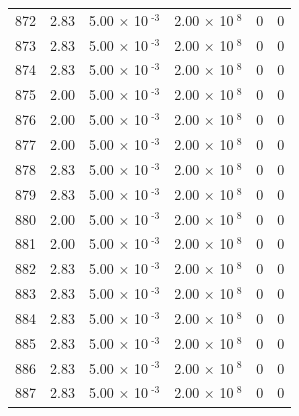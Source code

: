 \documentclass[a4paper,11pt]{article}
\begin{document}
\begin{center}
\begin{longtable}{|R{1.5cm}|R{2.4cm}|R{2.4cm}|R{2.4cm}|R{2.4cm}|R{2.4cm}|}
  872 &   2.83  &         5.00 $\times$ 10$^{\text{          -3}}$  &         2.00 $\times$ 10$^{\text{           8}}$  & 0  & 0 \\
  873 &   2.83  &         5.00 $\times$ 10$^{\text{          -3}}$  &         2.00 $\times$ 10$^{\text{           8}}$  & 0  & 0 \\
  874 &   2.83  &         5.00 $\times$ 10$^{\text{          -3}}$  &         2.00 $\times$ 10$^{\text{           8}}$  & 0  & 0 \\
  875 &   2.00  &         5.00 $\times$ 10$^{\text{          -3}}$  &         2.00 $\times$ 10$^{\text{           8}}$  & 0  & 0 \\
  876 &   2.00  &         5.00 $\times$ 10$^{\text{          -3}}$  &         2.00 $\times$ 10$^{\text{           8}}$  & 0  & 0 \\
  877 &   2.00  &         5.00 $\times$ 10$^{\text{          -3}}$  &         2.00 $\times$ 10$^{\text{           8}}$  & 0  & 0 \\
  878 &   2.83  &         5.00 $\times$ 10$^{\text{          -3}}$  &         2.00 $\times$ 10$^{\text{           8}}$  & 0  & 0 \\
  879 &   2.83  &         5.00 $\times$ 10$^{\text{          -3}}$  &         2.00 $\times$ 10$^{\text{           8}}$  & 0  & 0 \\
  880 &   2.00  &         5.00 $\times$ 10$^{\text{          -3}}$  &         2.00 $\times$ 10$^{\text{           8}}$  & 0  & 0 \\
  881 &   2.00  &         5.00 $\times$ 10$^{\text{          -3}}$  &         2.00 $\times$ 10$^{\text{           8}}$  & 0  & 0 \\
  882 &   2.83  &         5.00 $\times$ 10$^{\text{          -3}}$  &         2.00 $\times$ 10$^{\text{           8}}$  & 0  & 0 \\
  883 &   2.83  &         5.00 $\times$ 10$^{\text{          -3}}$  &         2.00 $\times$ 10$^{\text{           8}}$  & 0  & 0 \\
  884 &   2.83  &         5.00 $\times$ 10$^{\text{          -3}}$  &         2.00 $\times$ 10$^{\text{           8}}$  & 0  & 0 \\
  885 &   2.83  &         5.00 $\times$ 10$^{\text{          -3}}$  &         2.00 $\times$ 10$^{\text{           8}}$  & 0  & 0 \\
  886 &   2.83  &         5.00 $\times$ 10$^{\text{          -3}}$  &         2.00 $\times$ 10$^{\text{           8}}$  & 0  & 0 \\
  887 &   2.83  &         5.00 $\times$ 10$^{\text{          -3}}$  &         2.00 $\times$ 10$^{\text{           8}}$  & 0  & 0 \\

\end{longtable}
\end{center}
\end{document}
